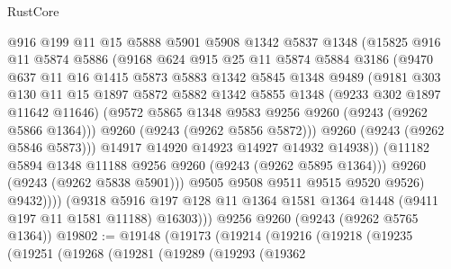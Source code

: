 \begin{lexlean}{RustCore}
\begin{coremodule}
                    @916
                    @199
                    @11
                    @15
                    @5888
                    @5901
                    @5908
                    @1342
                    @5837
                    @1348
                    (@15825
                      @916
                      @11
                      @5874
                      @5886
                      (@9168
                        @624
                        @915
                        @25
                        @11
                        @5874
                        @5884
                        @3186
                        (@9470
                          @637
                          @11
                          @16
                          @1415
                          @5873
                          @5883
                          @1342
                          @5845
                          @1348
                          @9489
                          (@9181
                            @303
                            @130
                            @11
                            @15
                            @1897
                            @5872
                            @5882
                            @1342
                            @5855
                            @1348
                            (@9233 @302 @1897 @11642 @11646)
                            (@9572 @5865 @1348 @9583 @9256 @9260 (@9243 (@9262 @5866 @1364)))
                            @9260
                            (@9243 (@9262 @5856 @5872)))
                          @9260
                          (@9243 (@9262 @5846 @5873)))
                        @14917
                        @14920
                        @14923
                        @14927
                        @14932
                        @14938))
                    (@11182 @5894 @1348 @11188 @9256 @9260 (@9243 (@9262 @5895 @1364)))
                    @9260
                    (@9243 (@9262 @5838 @5901)))
                  @9505
                  @9508
                  @9511
                  @9515
                  @9520
                  @9526)
                @9432))))
        (@9318 @5916 @197 @128 @11 @1364 @1581 @1364 @1448 (@9411 @197 @11 @1581 @11188) @16303)))
    @9256
    @9260
    (@9243 (@9262 @5765 @1364))
@19802 := @19148
    (@19173
      (@19214
        (@19216
          (@19218
            (@19235
              (@19251
                (@19268
                  (@19281
                    (@19289
                      (@19293
                        (@19362

\end{coremodule}
\end{lexlean}
